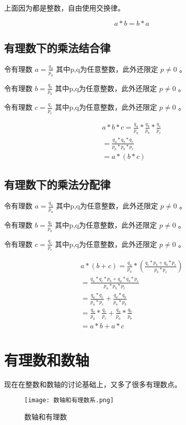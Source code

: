 \documentclass[12pt,oneside]{book}
\begin{document}
上面因为都是整数，自由使用交换律。

\begin{equation}
a * b = b * a
\end{equation}


\subsection{有理数下的乘法结合律}
令有理数 $a = \frac{q_a}{p_a}$ 其中p,q为任意整数，此外还限定 $p \neq 0$ 。

令有理数 $b = \frac{q_b}{p_b}$ 其中p,q为任意整数，此外还限定 $p \neq 0$ 。

令有理数 $c = \frac{q_c}{p_c}$ 其中p,q为任意整数，此外还限定 $p \neq 0$ 。

\begin{align*}
a * b * c = \frac{q_a}{p_a} * \frac{q_b}{p_b} * \frac{q_c}{p_c}\\
= \frac{q_a * q_b * q_c}{p_a*p_b*p_c} \\
= a * (b *c)
\end{align*}



\subsection{有理数下的乘法分配律}
令有理数 $a = \frac{q_a}{p_a}$ 其中p,q为任意整数，此外还限定 $p \neq 0$ 。

令有理数 $b = \frac{q_b}{p_b}$ 其中p,q为任意整数，此外还限定 $p \neq 0$ 。

令有理数 $c = \frac{q_c}{p_c}$ 其中p,q为任意整数，此外还限定 $p \neq 0$ 。


\begin{align*}
a * (b + c) = \frac{q_a}{p_a} * ( \frac{q_c * p_b + q_b * p_c}{p_b * p_c})\\
= \frac{q_a*q_c*p_b + q_a*q_b*p_c}{p_a*p_b*p_c}\\
= \frac{q_a*q_c}{p_a*p_c} + \frac{q_a*q_b}{p_a*p_b}\\
=\frac{q_a}{p_a} * \frac{q_c}{p_c} + \frac{q_a}{p_a} * \frac{q_b}{p_b}\\
= a*b + a*c
\end{align*}


\section{有理数和数轴}
现在在整数和数轴的讨论基础上，又多了很多有理数点。

\begin{figure}[H]
\centering
\texttt{[image: 数轴和有理数系.png]}
\caption{数轴和有理数}
\end{figure}
\end{document}
